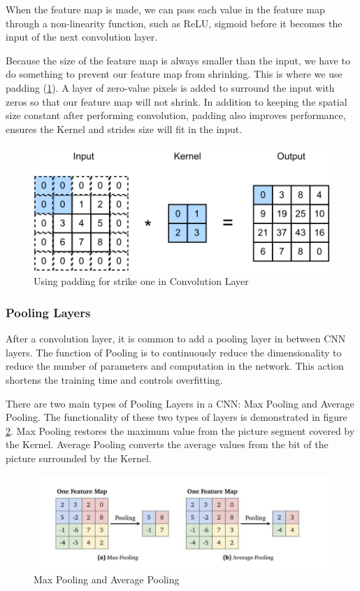 When the feature map is made, we can pass each value in the feature map through a non-linearity function, such as ReLU, sigmoid before it becomes the input of the next convolution layer.

Because the size of the feature map is always smaller than the input, we have to do something to prevent our feature map from shrinking. This is where we use padding (\ref{fig:Chap3-CNN_Padding}). A layer of zero-value pixels is added to surround the input with zeros so that our feature map will not shrink. In addition to keeping the spatial size constant after performing convolution, padding also improves performance, ensures the Kernel and strides size will fit in the input.

\begin{figure}[H]
	\centering
	\includegraphics[width=\textwidth]{img/Chap3/CNN_Padding}
	\caption{Using padding for strike one in Convolution Layer}
	\label{fig:Chap3-CNN_Padding}
\end{figure}
\subsubsection{Pooling Layers}

After a convolution layer, it is common to add a pooling layer in between CNN layers. The function of Pooling is to continuously reduce the dimensionality to reduce the number of parameters and computation in the network. This action shortens the training time and controls overfitting.

There are two main types of Pooling Layers in a CNN: Max Pooling and Average Pooling. The functionality of these two types of layers is demonstrated in figure \ref{fig:Chap3-CNN_Pooling}. Max Pooling restores the maximum value from the picture segment covered by the Kernel. Average Pooling converts the average values from the bit of the picture surrounded by the Kernel.

\begin{figure}[H]
	\centering
	\includegraphics[width=\textwidth]{img/Chap3/Pooling}
	\caption{Max Pooling and Average Pooling}
	\label{fig:Chap3-CNN_Pooling}
\end{figure}


